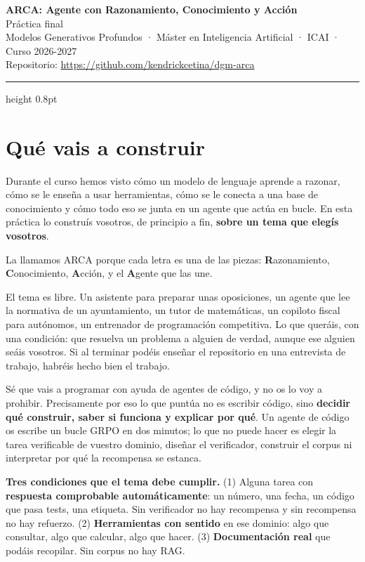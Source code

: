\documentclass[11pt,a4paper]{article}
\begin{document}
\begin{center}
  {\Large\bfseries\color{arcablue} ARCA: Agente con Razonamiento, Conocimiento y Acción}\\[0.5ex]
  {\large Práctica final}\\[1.2ex]
  {\small Modelos Generativos Profundos · Máster en Inteligencia Artificial · ICAI · Curso 2026-2027}\\[0.8ex]
  {\small Repositorio: \url{https://github.com/kendrickcetina/dgm-arca}}
\end{center}

\vspace{0.6ex}
{\color{arcarule}\hrule height 0.8pt}
\vspace{1.2ex}

\section{Qué vais a construir}

Durante el curso hemos visto cómo un modelo de lenguaje aprende a razonar, cómo se le enseña
a usar herramientas, cómo se le conecta a una base de conocimiento y cómo todo eso se junta
en un agente que actúa en bucle. En esta práctica lo construís vosotros, de principio a fin,
\textbf{sobre un tema que elegís vosotros}.

La llamamos ARCA porque cada letra es una de las piezas: \textbf{R}azonamiento,
\textbf{C}onocimiento, \textbf{A}cción, y el \textbf{A}gente que las une.

El tema es libre. Un asistente para preparar unas oposiciones, un agente que lee la normativa
de un ayuntamiento, un tutor de matemáticas, un copiloto fiscal para autónomos, un entrenador
de programación competitiva. Lo que queráis, con una condición: que resuelva un problema a
alguien de verdad, aunque ese alguien seáis vosotros. Si al terminar podéis enseñar el
repositorio en una entrevista de trabajo, habréis hecho bien el trabajo.

Sé que vais a programar con ayuda de agentes de código, y no os lo voy a prohibir.
Precisamente por eso lo que puntúa no es escribir código, sino \textbf{decidir qué construir,
saber si funciona y explicar por qué}. Un agente de código os escribe un bucle GRPO en dos
minutos; lo que no puede hacer es elegir la tarea verificable de vuestro dominio, diseñar el
verificador, construir el corpus ni interpretar por qué la recompensa se estanca.

\begin{nota}
\textbf{Tres condiciones que el tema debe cumplir.} (1) Alguna tarea con \textbf{respuesta
comprobable automáticamente}: un número, una fecha, un código que pasa tests, una etiqueta.
Sin verificador no hay recompensa y sin recompensa no hay refuerzo. (2) \textbf{Herramientas
con sentido} en ese dominio: algo que consultar, algo que calcular, algo que hacer.
(3) \textbf{Documentación real} que podáis recopilar. Sin corpus no hay RAG.
\end{nota}
\end{document}
